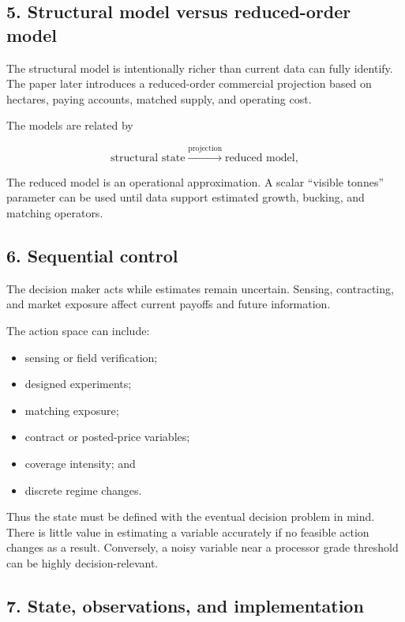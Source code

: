 \subsection{5. Structural model versus reduced-order model}\label{structural-model-versus-reduced-order-model}

The structural model is intentionally richer than current data can fully
identify. The paper later introduces a reduced-order commercial projection
based on hectares, paying accounts, matched supply, and operating cost.

The models are related by

\[
\text{structural state} \xrightarrow{\text{projection}} \text{reduced model},
\]

The reduced model is an operational approximation. A scalar ``visible tonnes''
parameter can be used until data support estimated growth, bucking, and matching
operators.

\subsection{6. Sequential control}\label{sequential-control-1}

The decision maker acts while estimates remain uncertain. Sensing, contracting,
and market exposure affect current payoffs and future information.

The action space can include:

\begin{itemize}
\tightlist
\item
  sensing or field verification;
\item
  designed experiments;
\item
  matching exposure;
\item
  contract or posted-price variables;
\item
  coverage intensity; and
\item
  discrete regime changes.
\end{itemize}

Thus the state must be defined with the eventual decision problem in mind.
There is little value in estimating a variable accurately if no feasible action
changes as a result. Conversely, a noisy variable near a processor grade
threshold can be highly decision-relevant.

\subsection{7. State, observations, and implementation}\label{state-observations-and-implementation}


